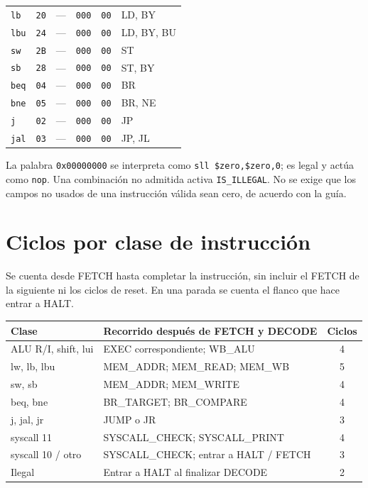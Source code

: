 \documentclass[11pt,a4paper]{article}
\newcommand{\sig}[1]{\texttt{#1}}
\begin{document}
\begin{center}
\begin{tabularx}{\linewidth}{@{}l c c c c X@{}}
\sig{lb} & \sig{20} & --- & \sig{000} & \sig{00} & LD, BY \\
\sig{lbu} & \sig{24} & --- & \sig{000} & \sig{00} & LD, BY, BU \\
\sig{sw} & \sig{2B} & --- & \sig{000} & \sig{00} & ST \\
\sig{sb} & \sig{28} & --- & \sig{000} & \sig{00} & ST, BY \\
\sig{beq} & \sig{04} & --- & \sig{000} & \sig{00} & BR \\
\sig{bne} & \sig{05} & --- & \sig{000} & \sig{00} & BR, NE \\
\sig{j} & \sig{02} & --- & \sig{000} & \sig{00} & JP \\
\sig{jal} & \sig{03} & --- & \sig{000} & \sig{00} & JP, JL \\
\bottomrule
\end{tabularx}
\label{tab:isa}
\end{center}

La palabra \sig{0x00000000} se interpreta como
\sig{sll \$zero,\$zero,0}; es legal y actúa como \sig{nop}. Una combinación
no admitida activa \sig{IS\_ILLEGAL}. No se exige que los campos no usados
de una instrucción válida sean cero, de acuerdo con la guía.

\section{Ciclos por clase de instrucción}

Se cuenta desde FETCH hasta completar la instrucción, sin incluir el FETCH
de la siguiente ni los ciclos de reset. En una parada se cuenta el flanco
que hace entrar a HALT.

\begin{center}\small\setlength{\tabcolsep}{5pt}
\begin{tabularx}{\linewidth}{@{}l X c@{}}
\toprule Clase & Recorrido después de FETCH y DECODE & Ciclos \\\midrule
ALU R/I, shift, lui & EXEC correspondiente; WB\_ALU & 4 \\
lw, lb, lbu & MEM\_ADDR; MEM\_READ; MEM\_WB & 5 \\
sw, sb & MEM\_ADDR; MEM\_WRITE & 4 \\
beq, bne & BR\_TARGET; BR\_COMPARE & 4 \\
j, jal, jr & JUMP o JR & 3 \\
syscall 11 & SYSCALL\_CHECK; SYSCALL\_PRINT & 4 \\
syscall 10 / otro & SYSCALL\_CHECK; entrar a HALT / FETCH & 3 \\
Ilegal & Entrar a HALT al finalizar DECODE & 2 \\\bottomrule
\end{tabularx}
\end{center}
\end{document}
